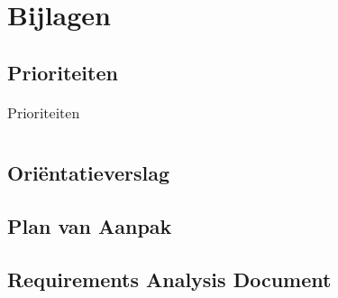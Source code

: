 \section{Bijlagen}
\label{Bijlagen}
\subsection{Prioriteiten}
\begin{table*}[htbp]
	\caption{Prioriteiten}
	\label{tab:Prioriteiten}
	\begin{tabular}{}
	\end{tabular}
\end{table*}

\subsection{Ori\"{e}ntatieverslag}

\subsection{Plan van Aanpak}

\subsection{Requirements Analysis Document}
